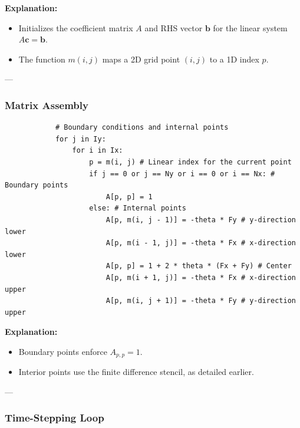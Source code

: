 \documentclass{article}
\begin{document}
		\noindent
		\textbf{Explanation:}
		\begin{itemize}
			\item Initializes the coefficient matrix $A$ and RHS vector $\mathbf{b}$ for the linear system $A \mathbf{c} = \mathbf{b}$.
			\item The function $m(i, j)$ maps a 2D grid point $(i, j)$ to a 1D index $p$.
		\end{itemize}
		
		---
		
		\subsubsection{Matrix Assembly}
		\begin{lstlisting}
			# Boundary conditions and internal points
			for j in Iy:
				for i in Ix:
					p = m(i, j) # Linear index for the current point
					if j == 0 or j == Ny or i == 0 or i == Nx: # Boundary points
						A[p, p] = 1 
					else: # Internal points
						A[p, m(i, j - 1)] = -theta * Fy # y-direction lower
						A[p, m(i - 1, j)] = -theta * Fx # x-direction lower
						A[p, p] = 1 + 2 * theta * (Fx + Fy) # Center
						A[p, m(i + 1, j)] = -theta * Fx # x-direction upper
						A[p, m(i, j + 1)] = -theta * Fy # y-direction upper
		\end{lstlisting}
		
		\noindent
		\textbf{Explanation:}
		\begin{itemize}
			\item Boundary points enforce $A_{p,p} = 1$.
			\item Interior points use the finite difference stencil, as detailed earlier.
		\end{itemize}
		
		---
		
		\subsubsection{Time-Stepping Loop}
		
\end{document}
